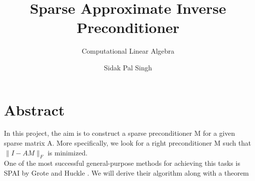 \documentclass[paper=A4, fontsize=11pt]{scrartcl}
\title{Sparse Approximate Inverse Preconditioner}
\subtitle{Computational Linear Algebra}
\author{Sidak Pal Singh}
\theoremstyle{remark}
\begin{document}
	\maketitle
	
	\section{Abstract}
	
	In this project, the aim is to construct a sparse preconditioner M for a given sparse matrix A. More specifically, we look for a right preconditioner M such that $\|I-A M\|_{F}$ is minimized. \\
	One of the most successful general-purpose methods for achieving this tasks is SPAI by Grote and Huckle \cite{grote}. We will derive their algorithm along with a theorem 
	

	\newpage
	
\end{document}
